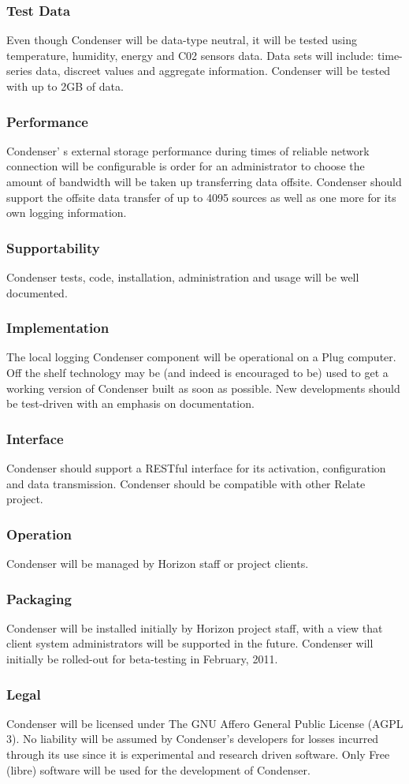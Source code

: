 		\subsubsection{Test Data}
Even though Condenser will be data-type neutral, it will be tested using temperature, humidity, energy and C02 sensors data. Data sets will include: time-series data, discreet values and aggregate information. Condenser will be tested with up to 2GB of data.		
		\subsubsection{Performance}
Condenser'	s external storage performance during times of reliable network connection will be configurable is order for an administrator to choose the amount of bandwidth will be taken up transferring data offsite. Condenser should support the offsite data transfer of up to 4095 sources as well as one more for its own logging information. 	
		\subsubsection{Supportability}
Condenser tests, code, installation, administration and usage will be well documented.	
		\subsubsection{Implementation}
The local logging Condenser component will be operational on a Plug computer. Off the shelf technology may be (and indeed is encouraged to be) used to get a working version of Condenser built as soon as possible. New developments should be test-driven with an emphasis on documentation. 		
		\subsubsection{Interface}
Condenser should support a RESTful interface for its activation, configuration and data transmission. Condenser should be compatible with other Relate project.		
		\subsubsection{Operation}
Condenser will be managed by Horizon staff or project clients.		
		\subsubsection{Packaging}
Condenser will be installed initially by Horizon project staff, with a view that client system administrators will be supported in the future. Condenser will initially be rolled-out for beta-testing in February, 2011.  		
		\subsubsection{Legal}
Condenser will be licensed under The GNU Affero General Public License (AGPL 3). No liability will be assumed by Condenser's developers for losses incurred through its use since it is experimental and research driven software. Only Free (libre) software will be used for the development of Condenser.		